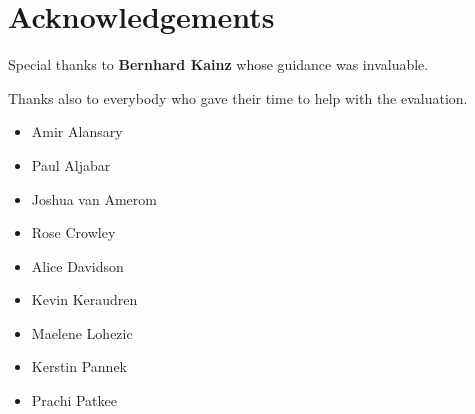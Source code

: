 \chapter*{Acknowledgements}

Special thanks to \textbf{Bernhard Kainz} whose guidance was invaluable.

Thanks also to everybody who gave their time to help with the evaluation.

\begin{itemize}
	\item[] Amir Alansary
	\item[] Paul Aljabar
	\item[] Joshua van Amerom
	\item[] Rose Crowley
	\item[] Alice Davidson
	\item[] Kevin Keraudren
	\item[] Maelene Lohezic
	\item[] Kerstin Pannek
	\item[] Prachi Patkee
\end{itemize}